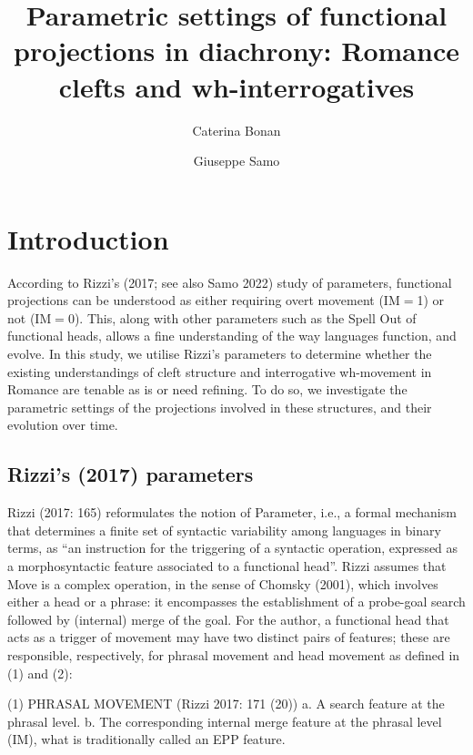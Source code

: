 \documentclass[fleqn,10pt]{wlscirep}
\title{Parametric settings of functional projections in diachrony: Romance clefts and wh-interrogatives}
\author[1,*]{Caterina Bonan}
\author[2]{Giuseppe Samo}
\affil[1]{University of Cambridge, United Kingdom.}
\affil[2]{Beijing Language and Culture University, People’s Republic of China.}
\affil[*]{Corresponding author: cb2098@cam.ac.uk}
\begin{document}
\flushbottom
\maketitle
%
%
\thispagestyle{empty}


\section*{Introduction}

According to Rizzi’s (2017; see also Samo 2022) study of parameters, functional projections can be understood as either requiring overt movement (IM$=$1) or not (IM$=$0). 
This, along with other parameters such as the Spell Out of functional heads, allows a fine understanding of the way languages function, and evolve. 
In this study, we utilise Rizzi’s parameters to determine whether the existing understandings of cleft structure and interrogative wh-movement in Romance are tenable as is or need refining. 
To do so, we investigate the parametric settings of the projections involved in these structures, and their evolution over time.

\subsection*{Rizzi's (2017) parameters}

Rizzi (2017: 165) reformulates the notion of Parameter, i.e., a formal mechanism that determines a finite set of syntactic variability among languages in binary terms, as “an instruction for the triggering of a syntactic operation, expressed as a morphosyntactic feature associated to a functional head”. Rizzi assumes that Move is a complex operation, in the sense of Chomsky (2001), which involves either a head or a phrase: it encompasses the establishment of a probe-goal search followed by (internal) merge of the goal. For the author, a functional head that acts as a trigger of movement may have two distinct pairs of features; these are responsible, respectively, for phrasal movement and head movement as defined in (1) and (2):

(1)		PHRASAL MOVEMENT (Rizzi 2017: 171 (20))
a.	A search feature at the phrasal level.
b.	The corresponding internal merge feature at the phrasal level (IM), what is traditionally called an EPP feature.
\end{document}
